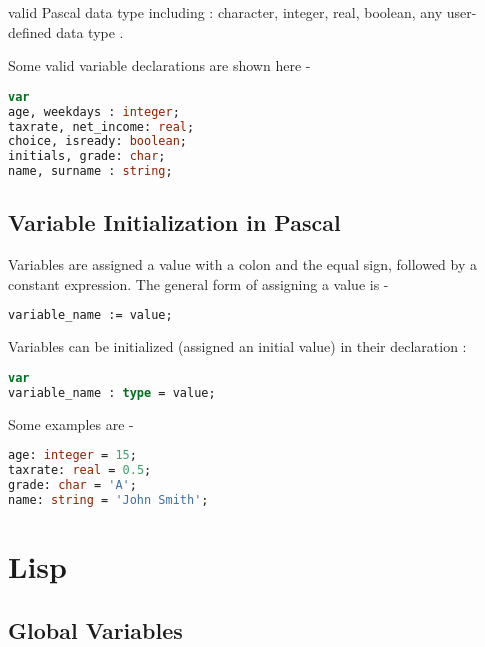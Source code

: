 \documentclass[12pt]{article}
\begin{document}
valid Pascal data type including :
 character, integer,  real, boolean,  any user-defined data type .


Some valid variable declarations are shown here - 


\lstset{style=mystyle}
\begin{lstlisting}[language=Pascal, caption=Pascal example]
var
age, weekdays : integer;
taxrate, net_income: real;
choice, isready: boolean;
initials, grade: char;
name, surname : string;
\end{lstlisting}


\newpage

\subsection{Variable Initialization in Pascal}


Variables are assigned a value with a colon and the equal sign, followed by a constant expression. The general form of assigning a value is -


\lstset{style=mystyle}
\begin{lstlisting}[language=Pascal, caption=Pascal example]
variable_name := value;
\end{lstlisting}


Variables can be initialized (assigned an initial value) in their declaration :



\lstset{style=mystyle}
\begin{lstlisting}[language=Pascal, caption=Pascal example]
var
variable_name : type = value;
\end{lstlisting}


Some examples are -



\lstset{style=mystyle}
\begin{lstlisting}[language=Pascal, caption=Pascal example]
age: integer = 15;
taxrate: real = 0.5;
grade: char = 'A';
name: string = 'John Smith';
\end{lstlisting}



\newpage

\section{Lisp}


\subsection{Global Variables}
\end{document}
